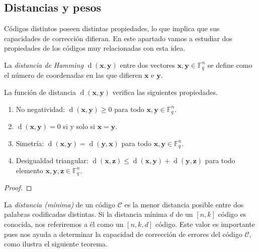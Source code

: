 \subsection{Distancias y pesos}


Códigos distintos poseen distintas propiedades, lo que implica que sus capacidades de corrección difieran.
En este apartado vamos a estudiar dos propiedades de los códigos 
muy relacionadas con esta idea.

\begin{definition}
  La \textit{distancia de Hamming} \(\operatorname{d}(\symbf{x}, \symbf{y})\) entre dos vectores \(\symbf{x}, \symbf{y} \in \mathbb F_q^n\) se define como el número de coordenadas en las que difieren \(\symbf{x}\) e \(\symbf{y}\).
\end{definition}

\begin{theorem}
  La función de distancia \(\operatorname{d}(\symbf{x}, \symbf{y})\) verifica las siguientes propiedades.
  \begin{enumerate}
    \item No negatividad: \(\operatorname{d}(\symbf{x}, \symbf{y}) \geq 0\) para todo \(\symbf{x}, \symbf{y}\in \mathbb F_q^n\).
    \item \(\operatorname{d}(\symbf{x}, \symbf{y}) = 0\) si y solo si \(\symbf{x} = \symbf{y}\).
    \item Simetría: \(\operatorname{d}(\symbf{x}, \symbf{y}) = \operatorname{d}(\symbf{y}, \symbf{x})\) para todo \(\symbf{x}, \symbf{y}\in \mathbb F_q^n\).
    \item Desigualdad triangular: \(\operatorname{d}(\symbf{x}, \symbf{z}) \leq \operatorname{d}(\symbf{x}, \symbf{y}) + \operatorname{d}(\symbf{y}, \symbf{z})\) para todo elemento \(\symbf{x}, \symbf{y}, \symbf{z}\in \mathbb F_q^n\).
  \end{enumerate}
\end{theorem}

\begin{proof}
  
\end{proof}

La \textit{distancia (mínima)} de un código \(\mathcal C\) es la menor distancia posible entre dos palabras codificadas distintas. 
Si la distancia mínima \(d\) de un \([n,k]\) código es conocida, nos referiremos a él como un \([n,k,d]\) código.
Este valor es importante pues nos ayuda a determinar la capacidad de corrección de errores del código \(\mathcal C\), como ilustra el siguiente teorema.

